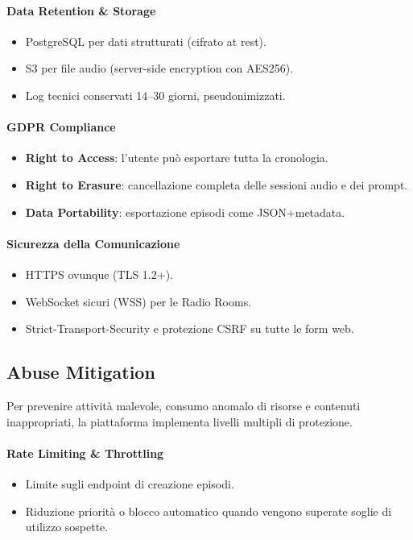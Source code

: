 \documentclass[11pt,a4paper]{article}
\begin{document}
\paragraph{Data Retention \& Storage}
\begin{itemize}
    \item PostgreSQL per dati strutturati (cifrato at rest).
    \item S3 per file audio (server-side encryption con AES256).
    \item Log tecnici conservati 14--30 giorni, pseudonimizzati.
\end{itemize}

\paragraph{GDPR Compliance}
\begin{itemize}
    \item \textbf{Right to Access}: l’utente può esportare tutta la cronologia.
    \item \textbf{Right to Erasure}: cancellazione completa delle sessioni audio e dei prompt.
    \item \textbf{Data Portability}: esportazione episodi come JSON+metadata.
\end{itemize}

\paragraph{Sicurezza della Comunicazione}
\begin{itemize}
    \item HTTPS ovunque (TLS 1.2+).
    \item WebSocket sicuri (WSS) per le Radio Rooms.
    \item Strict-Transport-Security e protezione CSRF su tutte le form web.
\end{itemize}


\subsection{Abuse Mitigation}

Per prevenire attività malevole, consumo anomalo di risorse e contenuti inappropriati, la piattaforma implementa livelli multipli di protezione.

\paragraph{Rate Limiting \& Throttling}
\begin{itemize}
    \item Limite sugli endpoint di creazione episodi.
    \item Riduzione priorità o blocco automatico quando vengono superate soglie di utilizzo sospette.
\end{itemize}
\end{document}
